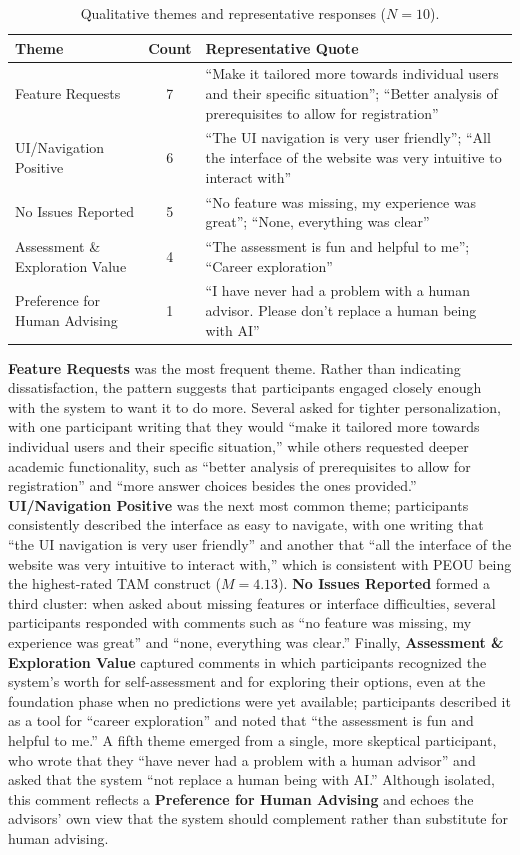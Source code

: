 \documentclass[letterpaper,11pt]{article}
\begin{document}
\begin{table}[htbp]
\caption{Qualitative themes and representative responses ($N=10$).}
\label{tab:themes}
\centering
\begin{tabular}{@{}lcp{7cm}@{}}
\toprule
\textbf{Theme} & \textbf{Count} & \textbf{Representative Quote} \\
\midrule
Feature Requests & 7 & ``Make it tailored more towards individual users and their specific situation''; ``Better analysis of prerequisites to allow for registration'' \\
UI/Navigation Positive & 6 & ``The UI navigation is very user friendly''; ``All the interface of the website was very intuitive to interact with'' \\
No Issues Reported & 5 & ``No feature was missing, my experience was great''; ``None, everything was clear'' \\
Assessment \& Exploration Value & 4 & ``The assessment is fun and helpful to me''; ``Career exploration'' \\
Preference for Human Advising & 1 & ``I have never had a problem with a human advisor. Please don't replace a human being with AI'' \\
\bottomrule
\end{tabular}
\end{table}

\textbf{Feature Requests} was the most frequent theme. Rather than indicating dissatisfaction, the pattern suggests that participants engaged closely enough with the system to want it to do more. Several asked for tighter personalization, with one participant writing that they would ``make it tailored more towards individual users and their specific situation,'' while others requested deeper academic functionality, such as ``better analysis of prerequisites to allow for registration'' and ``more answer choices besides the ones provided.'' \textbf{UI/Navigation Positive} was the next most common theme; participants consistently described the interface as easy to navigate, with one writing that ``the UI navigation is very user friendly'' and another that ``all the interface of the website was very intuitive to interact with,'' which is consistent with PEOU being the highest-rated TAM construct ($M=4.13$). \textbf{No Issues Reported} formed a third cluster: when asked about missing features or interface difficulties, several participants responded with comments such as ``no feature was missing, my experience was great'' and ``none, everything was clear.'' Finally, \textbf{Assessment \& Exploration Value} captured comments in which participants recognized the system's worth for self-assessment and for exploring their options, even at the foundation phase when no predictions were yet available; participants described it as a tool for ``career exploration'' and noted that ``the assessment is fun and helpful to me.'' A fifth theme emerged from a single, more skeptical participant, who wrote that they ``have never had a problem with a human advisor'' and asked that the system ``not replace a human being with AI.'' Although isolated, this comment reflects a \textbf{Preference for Human Advising} and echoes the advisors' own view that the system should complement rather than substitute for human advising.
\end{document}
